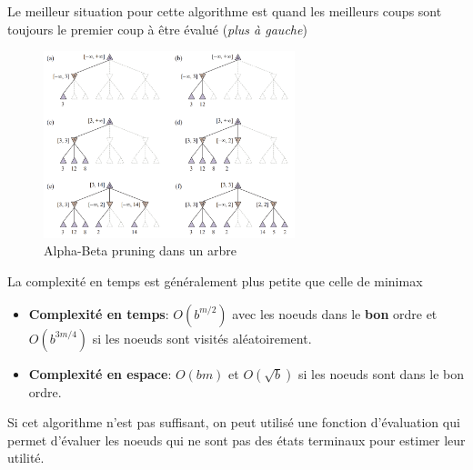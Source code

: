 \begin{remark}\leavevmode
    Le meilleur situation pour cette algorithme est quand les meilleurs coups sont toujours le 
    premier coup à être évalué (\textit{plus à gauche})
\end{remark}

\begin{figure}[H]
    \begin{center}
        \includegraphics[width=0.65\textwidth]{./pictures/alphabeta.png}
    \end{center}
    \caption{Alpha-Beta pruning dans un arbre}\label{fig:alphabeta} 
\end{figure}

\begin{remark}\leavevmode
    La complexité en temps est généralement plus petite que celle de minimax
    \begin{itemize}
        \item \textbf{Complexité en temps}: $O(b^{m/2})$ avec les noeuds dans le \textbf{bon} ordre
            et $O(b^{3m/4})$ si les noeuds sont visités aléatoirement.
        \item \textbf{Complexité en espace}: $O(bm)$ et $O(\sqrt{b})$ si les noeuds sont dans le bon ordre.
    \end{itemize}
\end{remark}

Si cet algorithme n'est pas suffisant, on peut utilisé une fonction d'évaluation qui permet d'évaluer les noeuds 
qui ne sont pas des états terminaux pour estimer leur utilité.

